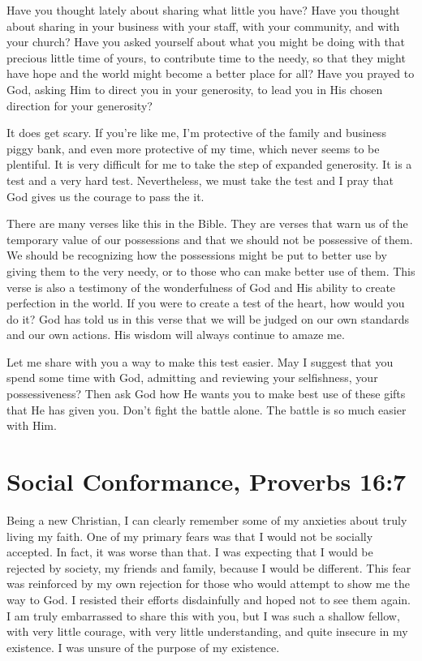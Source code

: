 \documentclass[12pt]{memoir}
\begin{document}
Have you thought lately about sharing what little you have? Have
you thought about sharing in your business with your staff, with your
community, and with your church? Have you asked yourself about what
you might be doing with that precious little time of yours, to contribute
time to the needy, so that they might have hope and the world might become a better place for all? Have you prayed to God, asking Him
to direct you in your generosity, to lead you in His chosen direction
for your generosity?

It does get scary. If you're like me, I'm
protective of the family and business piggy bank, and even more protective
of my time, which never seems to be plentiful. It is very difficult
for me to take the step of expanded generosity. It is a test
and a very hard test. Nevertheless, we must take the test and I pray
that God gives us the courage to pass the it.

There are many verses like this in the Bible. They are verses that
warn us of the temporary value of our possessions and that we should
not be possessive of them. We should be recognizing how the possessions
might be put to better use by giving them to the very needy, or to
those who can make better use of them. This verse is also a testimony
of the wonderfulness of God and His ability to create perfection in
the world. If you were to create a test of the heart, how would
you do it? God has told us in this verse that we will be judged on
our own standards and our own actions. His wisdom will always continue
to amaze me.

Let me share with you a way to make this test easier. May I suggest
that you spend some time with God, admitting and reviewing your selfishness,
your possessiveness? Then ask God how He wants you to make best use
of these gifts that He has given you. Don't fight the battle alone.
The battle is so much easier with Him.

\section[Social Conformance]{Social Conformance, Proverbs 16:7}

Being a new Christian, I can clearly remember some of my anxieties
about truly living my faith. One of my primary fears was that I would
not be socially accepted. In fact, it was worse than that. I was expecting
that I would be rejected by society, my friends and family, because
I would be different. This fear was reinforced by my own rejection
for those who would attempt to show me the way to God. I resisted
their efforts disdainfully and hoped not to see them again. I am
truly embarrassed to share this with you, but I was such a shallow
fellow, with very little courage, with very little understanding,
and quite insecure in my existence. I was unsure of the purpose of
my existence.
\end{document}
